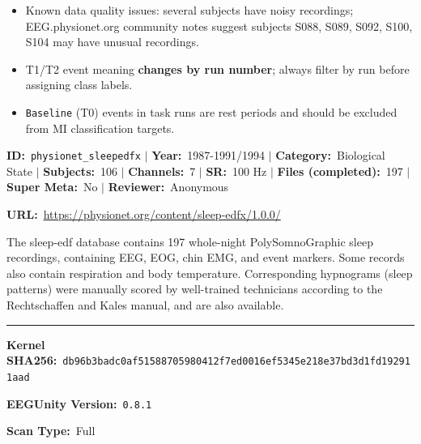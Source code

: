 {\begin{tcolorbox}
\begin{itemize}[leftmargin=1.4em,noitemsep,topsep=2pt]
\item{\footnotesize Known data quality issues: several subjects have noisy recordings; EEG.physionet.org community notes suggest subjects S088, S089, S092, S100, S104 may have unusual recordings.}
\item{\footnotesize T1/T2 event meaning \textbf{changes by run number}; always filter by run before assigning class labels.}
\item{\footnotesize \texttt{Baseline} (T0) events in task runs are rest periods and should be excluded from MI classification targets.}
\end{itemize}
\end{tcolorbox}
\vspace{3pt}
\noindent\begin{tcolorbox}[breakable,enhanced,colback=white,colframe=gray!55,boxrule=0.9pt,arc=4pt,left=6pt,right=6pt,top=4pt,bottom=4pt,title={\small\bfseries Sleep-EDF Database Expanded\hfill \colorbox{gray!20}{\scriptsize\sffamily\bfseries Completed}},coltitle=black,colbacktitle=gray!12,titlerule=0.5pt]
{\footnotesize \textbf{ID:}~\texttt{physionet\_sleepedfx} $\mid$ \textbf{Year:}~1987-1991/1994 $\mid$ \textbf{Category:}~Biological State $\mid$ \textbf{Subjects:}~106 $\mid$ \textbf{Channels:}~7 $\mid$ \textbf{SR:}~100 Hz $\mid$ \textbf{Files (completed):}~197 $\mid$ \textbf{Super Meta:}~No $\mid$ \textbf{Reviewer:}~Anonymous}
\par{\footnotesize\textbf{URL:}~\url{https://physionet.org/content/sleep-edfx/1.0.0/}}
\tcbline
{}\par\smallskip
{\footnotesize The sleep-edf database contains 197 whole-night PolySomnoGraphic sleep recordings, containing EEG, EOG, chin EMG, and event markers. Some records also contain respiration and body temperature. Corresponding hypnograms (sleep patterns) were manually scored by well-trained technicians according to the Rechtschaffen and Kales manual, and are also available.}
\noindent\rule{\linewidth}{0.4pt}\par\nopagebreak
{}\par\smallskip
{\scriptsize
\noindent\textbf{Kernel SHA256:}~\texttt{db96b3badc0af51588705980412f7ed0016ef5345e218e37bd3d1fd192911aad}\par\smallskip
\noindent\textbf{EEGUnity Version:}~\texttt{0.8.1}\par\smallskip
\noindent\textbf{Scan Type:}~Full\par\smallskip
}
\smallskip{}\par\smallskip

\end{tcolorbox}}
